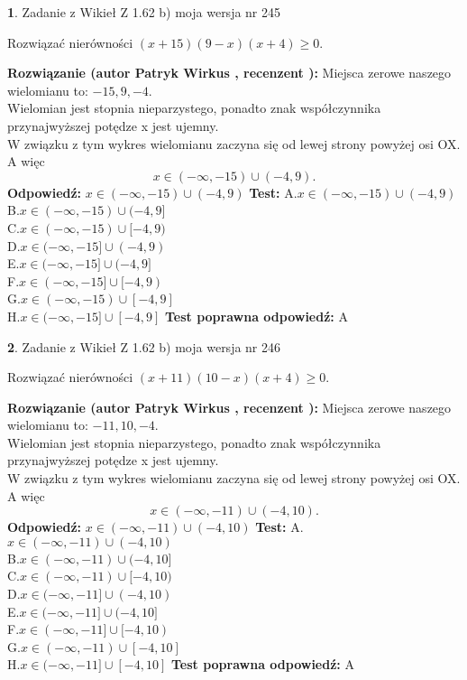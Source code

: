 \documentclass[12pt, a4paper]{article}
\theoremstyle{definition} %
\newtheorem{zad}{}
\newcommand{\zadStart}[1]{\begin{zad}#1\newline}
\newcommand{\zadStop}{\end{zad}}
\newcommand{\rozwStart}[2]{\noindent \textbf{Rozwiązanie (autor #1 , recenzent #2): }\newline}
\newcommand{\rozwStop}{\newline}
\newcommand{\odpStart}{\noindent \textbf{Odpowiedź:}\newline}
\newcommand{\odpStop}{\newline}
\newcommand{\testStart}{\noindent \textbf{Test:}\newline}
\newcommand{\testStop}{\newline}
\newcommand{\kluczStart}{\noindent \textbf{Test poprawna odpowiedź:}\newline}
\newcommand{\kluczStop}{\newline}
\begin{document}
\zadStart{Zadanie z Wikieł Z 1.62 b) moja wersja nr 245}

Rozwiązać nierówności $(x+15)(9-x)(x+4)\ge0$.
\zadStop
\rozwStart{Patryk Wirkus}{}
Miejsca zerowe naszego wielomianu to: $-15, 9, -4$.\\
Wielomian jest stopnia nieparzystego, ponadto znak współczynnika przy\linebreak najwyższej potędze x jest ujemny.\\ W związku z tym wykres wielomianu zaczyna się od lewej strony powyżej osi OX. A więc $$x \in (-\infty,-15) \cup (-4,9).$$
\rozwStop
\odpStart
$x \in (-\infty,-15) \cup (-4,9)$
\odpStop
\testStart
A.$x \in (-\infty,-15) \cup (-4,9)$\\
B.$x \in (-\infty,-15) \cup (-4,9]$\\
C.$x \in (-\infty,-15) \cup [-4,9)$\\
D.$x \in (-\infty,-15] \cup (-4,9)$\\
E.$x \in (-\infty,-15] \cup (-4,9]$\\
F.$x \in (-\infty,-15] \cup [-4,9)$\\
G.$x \in (-\infty,-15) \cup [-4,9]$\\
H.$x \in (-\infty,-15] \cup [-4,9]$
\testStop
\kluczStart
A
\kluczStop



\zadStart{Zadanie z Wikieł Z 1.62 b) moja wersja nr 246}

Rozwiązać nierówności $(x+11)(10-x)(x+4)\ge0$.
\zadStop
\rozwStart{Patryk Wirkus}{}
Miejsca zerowe naszego wielomianu to: $-11, 10, -4$.\\
Wielomian jest stopnia nieparzystego, ponadto znak współczynnika przy\linebreak najwyższej potędze x jest ujemny.\\ W związku z tym wykres wielomianu zaczyna się od lewej strony powyżej osi OX. A więc $$x \in (-\infty,-11) \cup (-4,10).$$
\rozwStop
\odpStart
$x \in (-\infty,-11) \cup (-4,10)$
\odpStop
\testStart
A.$x \in (-\infty,-11) \cup (-4,10)$\\
B.$x \in (-\infty,-11) \cup (-4,10]$\\
C.$x \in (-\infty,-11) \cup [-4,10)$\\
D.$x \in (-\infty,-11] \cup (-4,10)$\\
E.$x \in (-\infty,-11] \cup (-4,10]$\\
F.$x \in (-\infty,-11] \cup [-4,10)$\\
G.$x \in (-\infty,-11) \cup [-4,10]$\\
H.$x \in (-\infty,-11] \cup [-4,10]$
\testStop
\kluczStart
A
\kluczStop
\end{document}
